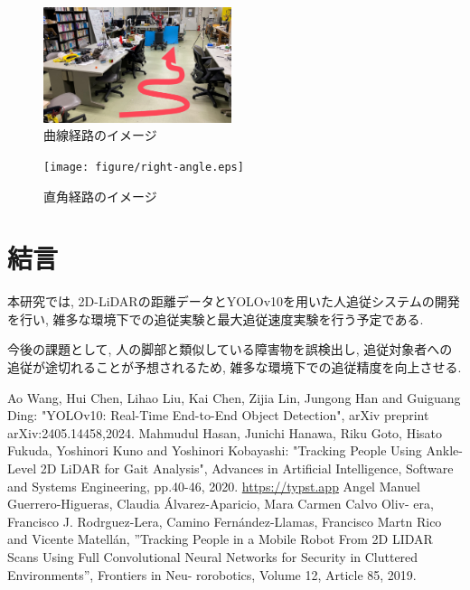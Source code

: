 \documentclass[twocolumn]{jarticle} %
\begin{document}
\begin{figure}[tb]
  \centering
  \large
  \includegraphics[width=55mm]{figure/curve.eps}
  \caption{曲線経路のイメージ}
  \label{fig:curve}
\end{figure}

\begin{figure}[tb]
  \centering
  \large
  \texttt{[image: figure/right-angle.eps]}
  \caption{直角経路のイメージ}
  \label{fig:right-angle}
\end{figure}

\section{結言}
本研究では, 2D-LiDARの距離データとYOLOv10を用いた人追従システムの開発を行い, 雑多な環境下での追従実験と最大追従速度実験を行う予定である.

今後の課題として, 人の脚部と類似している障害物を誤検出し, 追従対象者への追従が途切れることが予想されるため, 雑多な環境下での追従精度を向上させる.




\small
\begin{thebibliography}{9}

  Ao Wang, Hui Chen, Lihao Liu, Kai Chen, Zijia Lin, Jungong Han and Guiguang Ding: "YOLOv10: Real-Time End-to-End Object Detection", arXiv preprint arXiv:2405.14458,2024.
  Mahmudul Hasan, Junichi Hanawa, Riku Goto, Hisato Fukuda, Yoshinori Kuno and Yoshinori Kobayashi: "Tracking People Using Ankle-Level 2D LiDAR for Gait Analysis", Advances in Artificial Intelligence, Software and Systems Engineering, pp.40-46, 2020.
  \url{https://typst.app}
  Angel Manuel Guerrero-Higueras, Claudia Álvarez-Aparicio, Mara Carmen Calvo Oliv-
era, Francisco J. Rodrguez-Lera, Camino Fernández-Llamas, Francisco Martn Rico and
Vicente Matellán, ”Tracking People in a Mobile Robot From 2D LIDAR Scans Using Full
Convolutional Neural Networks for Security in Cluttered Environments”, Frontiers in Neu-
rorobotics, Volume 12, Article 85, 2019.
\end{thebibliography}
\end{document}

